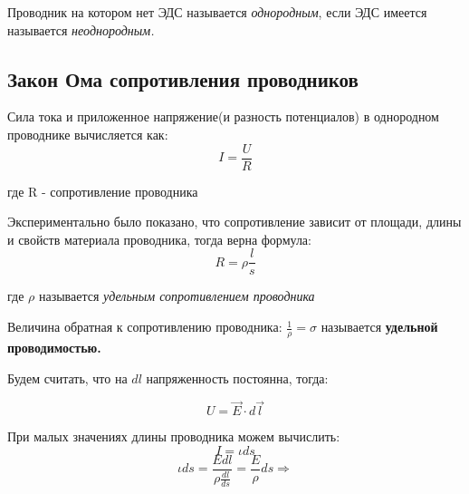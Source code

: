 \documentclass[../main.tex]{subfiles}
\begin{document}
\vspace{5px}

 Проводник на котором нет ЭДС называется \textit{однородным}, если ЭДС имеется называется \textit{неоднородным.}

\subsection{Закон Ома сопротивления проводников}

Сила тока и приложенное напряжение(и разность потенциалов) в однородном проводнике вычисляется как:
\[I = \frac{U}{R}\]
\begin{center}
    где R - сопротивление проводника
\end{center}


Экспериментально было показано, что сопротивление зависит от площади, длины и свойств материала проводника, тогда верна формула:
\[R = \rho \frac{l}{s}\]
\begin{center}
    где $\rho$  называется \textit{удельным сопротивлением проводника}
\end{center}
 Величина обратная к сопротивлению проводника: $\frac{1}{\rho} = \sigma$ называется \textbf{удельной проводимостью.}

\begin{center}


\end{center}

Будем считать, что на $dl$ напряженность постоянна, тогда:

\[U = \vec E \cdot d \vec l\]

При малых значениях длины проводника можем вычислить:
\[I = \iota ds \]
\[ \iota ds = \frac{E dl}{\rho \frac{dl}{ds}} =  \frac{E}{\rho} ds \Rightarrow\] 
\end{document}
